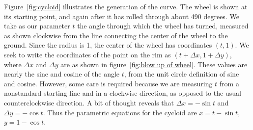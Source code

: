 \begin{solution}
Figure~\ref{fig:cycloid} illustrates the generation of the curve. The wheel is shown at its
starting point, and again after it has rolled through about 490
degrees. We take as our parameter $t$ the angle through which the
wheel has turned, measured as shown clockwise from the line connecting
the center of the wheel to the ground. Since the radius is 1, the
center of the wheel has coordinates $(t,1)$. We seek to write the
coordinates of the point on the rim as $(t+\Delta x,1+\Delta y)$,
where $\Delta x$ and $\Delta y$ are as shown in figure~\ref{fig:blow
  up of wheel}. These values are nearly the sine and cosine of the
angle $t$, from the unit circle definition of sine and
cosine. However, some care is required because we are measuring $t$
from a nonstandard starting line and in a clockwise direction, as
opposed to the usual counterclockwise direction. A bit of thought
reveals that $\Delta x=-\sin t$ and $\Delta y=-\cos t$. Thus the
parametric equations for the cycloid are $x=t-\sin t$, $y=1-\cos t$.
\end{solution}

